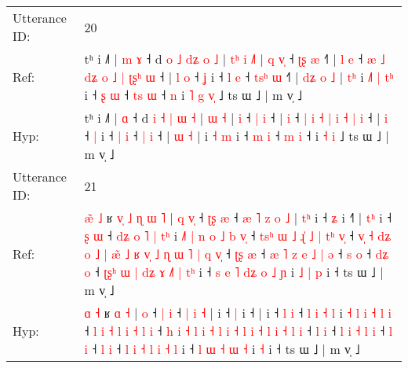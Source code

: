 \documentclass[10pt]{article}
\DeclareRobustCommand{\hl}[1]{{\textcolor{red}{#1}}}
\begin{document}
\begin{longtable}{ll}
 \\
\midrule
Utterance ID: & 20 \\
Ref: & tʰ i ˩˥ |\hl{ }\hl{m} \hl{ɤ} ˧ d \hl{o} \hl{˩} \hl{d}\hl{ʑ} \hl{o} \hl{˩} |\hl{ }\hl{t}\hl{ʰ} \hl{i} \hl{˩}\hl{˥} |\hl{ }\hl{q} \hl{v}\hl{̩} ˧ \hl{ʈ}\hl{ʂ} \hl{æ} ˧\hl{˥} |\hl{ }\hl{l} \hl{e} ˧ \hl{æ} \hl{˩} \hl{d}\hl{ʑ} \hl{o} \hl{˩} \hl{|} \hl{ʈ}\hl{ʂ}\hl{ʰ} \hl{ɯ} ˧ |\hl{ }\hl{l} \hl{o} ˧ \hl{ʝ} i ˧ \hl{l} \hl{e} ˧ \hl{t}\hl{s}\hl{ʰ} \hl{ɯ} ˧\hl{˥} |\hl{ }\hl{d}\hl{ʑ} \hl{o} \hl{˩} |\hl{ }\hl{t}\hl{ʰ} i\hl{ }\hl{˩}\hl{˥} \hl{|} \hl{t}\hl{ʰ} i ˧ \hl{ʂ} \hl{ɯ} ˧ \hl{t}\hl{s} \hl{ɯ} ˧\hl{ }\hl{n} i\hl{ }\hl{˥} \hl{g} \hl{v}\hl{̩} ˩ ts ɯ ˩ | m v̩ ˩
 \\
Hyp: & tʰ i ˩˥ |\hl{}\hl{} \hl{ɑ} ˧ d \hl{i} \hl{˧} \hl{}\hl{|} \hl{ɯ} \hl{˧} |\hl{}\hl{}\hl{} \hl{ɯ} \hl{}\hl{˧} |\hl{}\hl{} \hl{}\hl{i} ˧ \hl{}\hl{|} \hl{i} ˧\hl{} |\hl{}\hl{} \hl{i} ˧ \hl{|} \hl{i} \hl{}\hl{˧} \hl{|} \hl{i} \hl{˧} \hl{}\hl{}\hl{|} \hl{i} ˧ |\hl{}\hl{} \hl{i} ˧ \hl{|} i ˧ \hl{|} \hl{i} ˧ \hl{}\hl{}\hl{|} \hl{i} ˧\hl{} |\hl{}\hl{}\hl{} \hl{ɯ} \hl{˧} |\hl{}\hl{}\hl{} i\hl{}\hl{}\hl{} \hl{˧} \hl{}\hl{m} i ˧ \hl{m} \hl{i} ˧ \hl{}\hl{m} \hl{i} ˧\hl{}\hl{} i\hl{}\hl{} \hl{˧} \hl{}\hl{i} ˩ ts ɯ ˩ | m v̩ ˩
 \\
\midrule
Utterance ID: & 21 \\
Ref: & \hl{æ}\hl{̃} \hl{˩} ʁ\hl{ }\hl{v}\hl{̩}\hl{ }\hl{˩}\hl{ }\hl{ɳ} \hl{ɯ} \hl{˥} |\hl{ }\hl{q} \hl{v}\hl{̩} ˧ \hl{ʈ}\hl{ʂ} \hl{æ} ˧\hl{ }\hl{æ}\hl{ }\hl{˥} \hl{z} \hl{o} \hl{˩} |\hl{ }\hl{t}\hl{ʰ} i ˧ \hl{ʑ} i ˧\hl{˥} |\hl{ }\hl{t}\hl{ʰ} i ˧ \hl{ʂ} \hl{ɯ} ˧\hl{ }\hl{d}\hl{ʑ} \hl{o} \hl{˥} \hl{|} \hl{t}\hl{ʰ} i\hl{ }\hl{˩}\hl{˥} \hl{|} \hl{n} \hl{o} \hl{˩} \hl{b} \hl{v}\hl{̩} ˧ \hl{t}\hl{s}\hl{ʰ} \hl{ɯ} \hl{˩} \hl{ɻ}\hl{̍} \hl{˩} \hl{|} \hl{t}\hl{ʰ} \hl{v}\hl{̩} ˧ \hl{v}\hl{̩} \hl{˧} \hl{d}\hl{ʑ} \hl{o} \hl{˩} \hl{|} \hl{æ}\hl{̃} \hl{˩} \hl{ʁ} \hl{v}\hl{̩} \hl{˩} \hl{ɳ} \hl{ɯ} \hl{˥} \hl{|} \hl{q} \hl{v}\hl{̩} ˧ \hl{ʈ}\hl{ʂ} \hl{æ} ˧\hl{ }\hl{æ}\hl{ }\hl{˥} \hl{z} \hl{e} \hl{˩} \hl{|} \hl{ə} ˧ \hl{s} \hl{o} ˧ \hl{d}\hl{ʑ} \hl{o} ˧\hl{ }\hl{ʈ}\hl{ʂ}\hl{ʰ} \hl{ɯ} \hl{|} \hl{d}\hl{ʑ} \hl{ɤ} \hl{˩}\hl{˥} \hl{|} \hl{t}\hl{ʰ} i ˧\hl{ }\hl{s}\hl{ }\hl{e} \hl{˥} \hl{d}\hl{ʑ} \hl{o} \hl{˩} \hl{ɲ} i\hl{ }\hl{˩}\hl{ }\hl{|} \hl{p} i ˧ ts ɯ ˩ | m v̩ ˩
 \\
Hyp: & \hl{}\hl{ɑ} \hl{˧} ʁ\hl{}\hl{}\hl{}\hl{}\hl{}\hl{}\hl{} \hl{ɑ} \hl{˧} |\hl{}\hl{} \hl{}\hl{o} ˧ \hl{}\hl{|} \hl{i} ˧\hl{}\hl{}\hl{}\hl{} \hl{|} \hl{i} \hl{˧} |\hl{}\hl{}\hl{} i ˧ \hl{|} i ˧\hl{} |\hl{}\hl{}\hl{} i ˧ \hl{l} \hl{i} ˧\hl{}\hl{}\hl{} \hl{l} \hl{i} \hl{˧} \hl{}\hl{l} i\hl{}\hl{}\hl{} \hl{˧} \hl{l} \hl{i} \hl{˧} \hl{l} \hl{}\hl{i} ˧ \hl{}\hl{}\hl{l} \hl{i} \hl{˧} \hl{}\hl{l} \hl{i} \hl{˧} \hl{}\hl{l} \hl{}\hl{i} ˧ \hl{}\hl{h} \hl{i} \hl{}\hl{˧} \hl{l} \hl{i} \hl{˧} \hl{}\hl{l} \hl{i} \hl{˧} \hl{}\hl{l} \hl{i} \hl{˧} \hl{l} \hl{i} \hl{˧} \hl{l} \hl{}\hl{i} ˧ \hl{}\hl{l} \hl{i} ˧\hl{}\hl{}\hl{}\hl{} \hl{l} \hl{i} \hl{˧} \hl{l} \hl{i} ˧ \hl{l} \hl{i} ˧ \hl{}\hl{l} \hl{i} ˧\hl{}\hl{}\hl{}\hl{} \hl{l} \hl{i} \hl{}\hl{˧} \hl{l} \hl{}\hl{i} \hl{˧} \hl{}\hl{l} i ˧\hl{}\hl{}\hl{}\hl{} \hl{l} \hl{}\hl{ɯ} \hl{˧} \hl{ɯ} \hl{˧} i\hl{}\hl{}\hl{}\hl{} \hl{˧} i ˧ ts ɯ ˩ | m v̩ ˩

\end{longtable}
\end{document}
